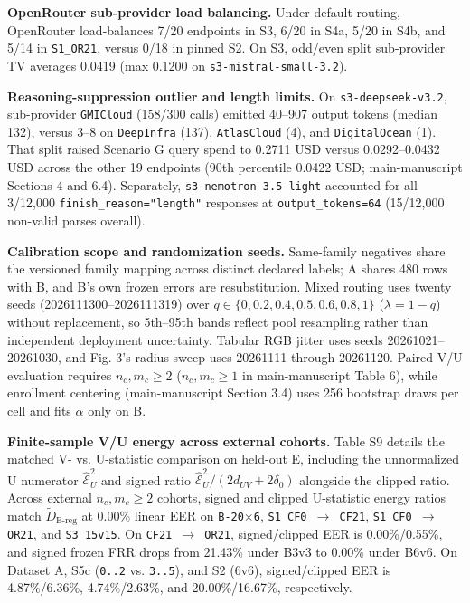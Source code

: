 \documentclass[10pt,letterpaper]{article}
\theoremstyle{definition}
\newcommand{\Dereg}{\tilde D_{\mathrm{E\mbox{-}reg}}}
\begin{document}
\textbf{OpenRouter sub-provider load balancing.} Under default routing, OpenRouter load-balances 7/20 endpoints in S3, 6/20 in S4a, 5/20 in S4b, and 5/14 in \texttt{S1\_\allowbreak{}OR21}, versus 0/18 in pinned S2. On S3, odd/even split sub-provider TV averages 0.0419 (max 0.1200 on \texttt{s3-\allowbreak{}mistral-\allowbreak{}small-\allowbreak{}3.\allowbreak{}2}).


\textbf{Reasoning-suppression outlier and length limits.} On \texttt{s3-\allowbreak{}deepseek-\allowbreak{}v3.\allowbreak{}2}, sub-provider \texttt{GMICloud} (158/300 calls) emitted 40--907 output tokens (median 132), versus 3--8 on \texttt{DeepInfra} (137), \texttt{AtlasCloud} (4), and \texttt{DigitalOcean} (1). That split raised Scenario G query spend to 0.2711 USD versus 0.0292--0.0432 USD across the other 19 endpoints (90th percentile 0.0422 USD; main-manuscript Sections 4 and 6.4). Separately, \texttt{s3-\allowbreak{}nemotron-\allowbreak{}3.\allowbreak{}5-\allowbreak{}light} accounted for all 3/12,000 \texttt{finish\_\allowbreak{}reason=\allowbreak{}"length"} responses at \texttt{output\_\allowbreak{}tokens=\allowbreak{}64} (15/12,000 non-valid parses overall).


\textbf{Calibration scope and randomization seeds.} Same-family negatives share the versioned family mapping across distinct declared labels; A shares 480 rows with B, and B's own frozen errors are resubstitution. Mixed routing uses twenty seeds (2026111300--2026111319) over $q \in \{0, 0.2, 0.4, 0.5, 0.6, 0.8, 1\}$ ($\lambda = 1 - q$) without replacement, so 5th--95th bands reflect pool resampling rather than independent deployment uncertainty. Tabular RGB jitter uses seeds 20261021--20261030, and Fig. 3's radius sweep uses 20261111 through 20261120. Paired V/U evaluation requires $n_c, m_c \ge 2$ ($n_c, m_c \ge 1$ in main-manuscript Table 6), while enrollment centering (main-manuscript Section 3.4) uses 256 bootstrap draws per cell and fits $\alpha$ only on B.


\textbf{Finite-sample V/U energy across external cohorts.} Table S9 details the matched V- vs. U-statistic comparison on held-out E, including the unnormalized U numerator $\widehat{\mathcal E}_U^2$ and signed ratio $\widehat{\mathcal E}_U^2/(2d_{UV}+2\delta_0)$ alongside the clipped ratio. Across external $n_c, m_c \ge 2$ cohorts, signed and clipped U-statistic energy ratios match $\Dereg{}$ at 0.00\% linear EER on \texttt{B-\allowbreak{}20\ensuremath{\times}6}, \texttt{S1 CF0 \ensuremath{\rightarrow} CF21}, \texttt{S1 CF0 \ensuremath{\rightarrow} OR21}, and \texttt{S3 15v15}. On \texttt{CF21 \ensuremath{\rightarrow} OR21}, signed/clipped EER is 0.00\%/0.55\%, and signed frozen FRR drops from 21.43\% under B3v3 to 0.00\% under B6v6. On Dataset A, S5c (\texttt{0.\allowbreak{}.\allowbreak{}2} vs. \texttt{3.\allowbreak{}.\allowbreak{}5}), and S2 (6v6), signed/clipped EER is 4.87\%/6.36\%, 4.74\%/2.63\%, and 20.00\%/16.67\%, respectively.
\end{document}

